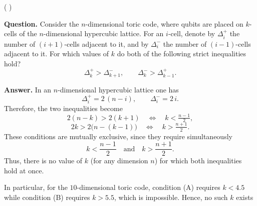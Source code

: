 \documentclass[manuscript,screen,review]{acmart}
\begin{document}

(  )



\textbf{Question.}  
Consider the $n$-dimensional toric code, where qubits are placed on $k$-cells of the $n$-dimensional hypercubic lattice.  
For an $i$-cell, denote by $\Delta_i^{+}$ the number of $(i{+}1)$-cells adjacent to it, and by $\Delta_i^{-}$ the number of $(i{-}1)$-cells adjacent to it.  
For which values of $k$ do both of the following strict inequalities hold?
\[
\Delta_k^{+} > \Delta_{k+1}^{-}, \qquad \Delta_k^{-} > \Delta_{k-1}^{+}.
\]

\textbf{Answer.}  
In an $n$-dimensional hypercubic lattice one has
\[
\Delta_i^{+} = 2\,(n-i), \qquad \Delta_i^{-} = 2\,i.
\]
Therefore, the two inequalities become
\[
2(n-k) > 2(k+1) \quad\iff\quad k < \tfrac{n-1}{2},
\]
\[
2k > 2\bigl(n-(k-1)\bigr) \quad\iff\quad k > \tfrac{n+1}{2}.
\]
These conditions are mutually exclusive, since they require simultaneously
\[
k < \frac{n-1}{2} \quad \text{and} \quad k > \frac{n+1}{2}.
\]
Thus, there is no value of $k$ (for any dimension $n$) for which both inequalities hold at once.  

In particular, for the $10$-dimensional toric code, condition (A) requires $k<4.5$ while condition (B) requires $k>5.5$, which is impossible. Hence, no such $k$ exists
\end{document}
